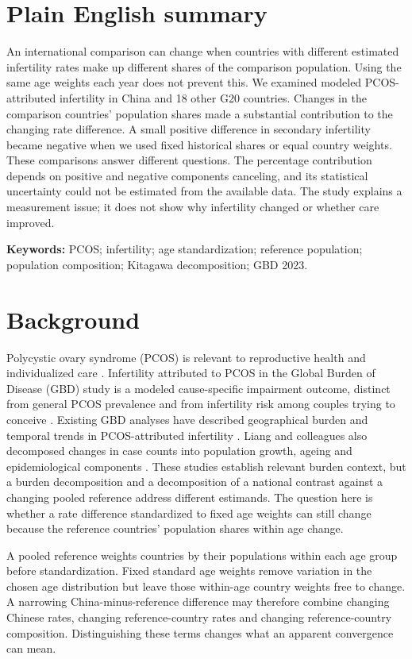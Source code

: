 \documentclass[11pt,a4paper]{article}
\begin{document}
\section*{Plain English summary}
An international comparison can change when countries with different estimated infertility rates make up different shares of the comparison population. Using the same age weights each year does not prevent this. We examined modeled PCOS-attributed infertility in China and 18 other G20 countries. Changes in the comparison countries' population shares made a substantial contribution to the changing rate difference. A small positive difference in secondary infertility became negative when we used fixed historical shares or equal country weights. These comparisons answer different questions. The percentage contribution depends on positive and negative components canceling, and its statistical uncertainty could not be estimated from the available data. The study explains a measurement issue; it does not show why infertility changed or whether care improved.

\textbf{Keywords:} PCOS; infertility; age standardization; reference population; population composition; Kitagawa decomposition; GBD 2023.

\section{Background}
Polycystic ovary syndrome (PCOS) is relevant to reproductive health and individualized care \cite{pcos}. Infertility attributed to PCOS in the Global Burden of Disease (GBD) study is a modeled cause-specific impairment outcome, distinct from general PCOS prevalence and from infertility risk among couples trying to conceive \cite{gbd}. Existing GBD analyses have described geographical burden and temporal trends in PCOS-attributed infertility \cite{liu_pcos2024,liang_burden2025,liang_trend2026,xu}. Liang and colleagues also decomposed changes in case counts into population growth, ageing and epidemiological components \cite{liang_burden2025}. These studies establish relevant burden context, but a burden decomposition and a decomposition of a national contrast against a changing pooled reference address different estimands. The question here is whether a rate difference standardized to fixed age weights can still change because the reference countries' population shares within age change.

A pooled reference weights countries by their populations within each age group before standardization. Fixed standard age weights remove variation in the chosen age distribution but leave those within-age country weights free to change. A narrowing China-minus-reference difference may therefore combine changing Chinese rates, changing reference-country rates and changing reference-country composition. Distinguishing these terms changes what an apparent convergence can mean.
\end{document}
